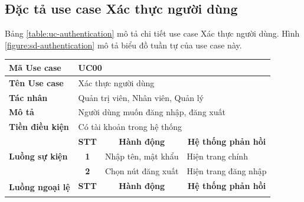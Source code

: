 \documentclass[../DoAn.tex]{subfiles}
\begin{document}
\subsection{Đặc tả use case Xác thực người dùng}
\label{section:uc-authentication}
Bảng \ref{table:uc-authentication} mô tả chi tiết use case Xác thực người dùng. Hình \ref{figure:sd-authentication} mô tả biểu đồ tuần tự của use case này.
\begin{table}[H]
    \begin{tabularx}{\textwidth}{|l|c|X|X|}
        \hline
        \textbf{Mã Use case}                     & \multicolumn{3}{l|}{UC00}                                                                                                                             \\ \hline
        \textbf{Tên Use case}                    & \multicolumn{3}{l|}{Xác thực người dùng}                                                                                                              \\ \hline
        \textbf{Tác nhân}                        & \multicolumn{3}{l|}{Quản trị viên, Nhân viên, Quản lý}                                                                                                \\ \hline
        \textbf{Mô tả}                           & \multicolumn{3}{l|}{Người dùng muốn đăng nhập, đăng xuất}                                                                                             \\ \hline
        \textbf{Tiền điều kiện}                  & \multicolumn{3}{l|}{Có tài khoản trong hệ thống}                                                                                                      \\ \hline
        \multirow{3}{*}{\textbf{Luồng sự kiện}}  & \multicolumn{1}{c|}{\textbf{STT}}                         & \multicolumn{1}{c|}{\textbf{Hành động}} & \multicolumn{1}{c|}{\textbf{Hệ thống phản hồi}} \\ \cline{2-4}
                                                 & \multirow{1}{*}{\textbf{1}}                               & Nhập tên, mật khẩu                      & Hiện trang chính                                \\ \cline{2-4}
                                                 & \multirow{1}{*}{\textbf{2}}                               & Chọn nút đăng xuất                      & Hiện trang đăng nhập                            \\ \hline
        \multirow{2}{*}{\textbf{Luồng ngoại lệ}} & \multicolumn{1}{c|}{\textbf{STT}}                         & \multicolumn{1}{c|}{\textbf{Hành động}} & \multicolumn{1}{c|}{\textbf{Hệ thống phản hồi}} \\ \cline{2-4}

\end{tabularx}
\end{table}
\end{document}
